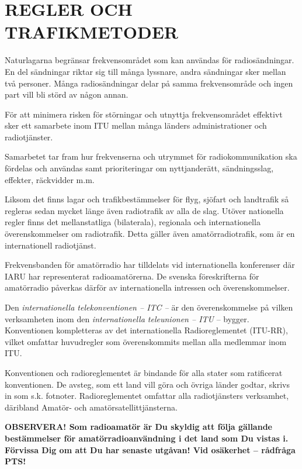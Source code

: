 \part{REGLER OCH TRAFIKMETODER}

Naturlagarna begränsar frekvensområdet som kan användas för radiosändningar.
En del sändningar riktar sig till många lyssnare, andra sändningar sker
mellan två personer. Många radiosändningar delar på samma frekvensområde och
ingen part vill bli störd av någon annan.

För att minimera risken för störningar och utnyttja frekvensområdet effektivt
sker ett samarbete inom ITU mellan många länders administrationer och
radiotjänster.

Samarbetet tar fram hur frekvenserna och utrymmet för radiokommunikation ska
fördelas och användas samt prioriteringar om nyttjanderätt, sändningsslag,
effekter, räckvidder m.m.

Liksom det finns lagar och trafikbestämmelser för flyg, sjöfart och landtrafik
så regleras sedan mycket länge även radiotrafik av alla de slag. Utöver
nationella regler finns det mellanstatliga (bilaterala), regionala och
internationella överenskommelser om radiotrafik. Detta gäller även
amatörradiotrafik, som är en internationell radiotjänst.

Frekvensbanden för amatörradio har tilldelats vid internationella konferenser
där IARU har representerat radioamatörerna. De svenska föreskrifterna för
amatörradio påverkas därför av internationella intressen och överenskommelser.

Den \emph{internationella telekonventionen -- ITC --} är den
överenskommelse på vilken verksamheten inom den \emph{internationella
teleunionen -- ITU} -- bygger. Konventionen kompletteras av det internationella
Radioreglementet (ITU-RR), vilket omfattar huvudregler som överenskommits mellan
alla medlemmar inom ITU.

Konventionen och radioreglementet är bindande för alla stater som ratificerat
konventionen. De avsteg, som ett land vill göra och övriga länder godtar,
skrivs in som s.k. fotnoter. Radioreglementet omfattar alla radiotjänsters
verksamhet, däribland Amatör- och amatörsatellittjänsterna.

\textbf{OBSERVERA!  Som radioamatör är Du skyldig att följa gällande
  bestämmelser för amatörradioanvändning i det land som Du vistas i.
  Förvissa Dig om att Du har senaste utgåvan!  Vid osäkerhet --
  rådfråga PTS!}
